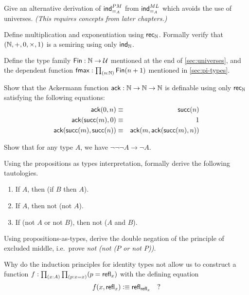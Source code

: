 \begin{ex}\label{ex:pm-to-ml}
Give an alternative derivation of $\mathsf{ind}_{=_A}^{PM}$ from $\mathsf{ind}_{=_A}^{ML}$ which avoids the use of universes.
  \emph{(This requires concepts from later chapters.)}
\end{ex}

\begin{ex}
Define multiplication and exponentiation using $\mathsf{rec}_{\mathbb{N}}$. Formally verify that $(\mathbb{N},+,0,\times,1)$ is a semiring using only $\mathsf{ind}_{\mathbb{N}}$.  
\end{ex}

\begin{ex}\label{ex:fin}
  Define the type family $\mathsf{Fin} : \mathbb{N} \to \mathcal{U}$ mentioned at the end of \autoref{sec:universes}, and the dependent function $\fmax : \prd{n:\nat} \Fin(n+1)$ mentioned in \autoref{sec:pi-types}.
\end{ex}

\begin{ex}\label{ex:ackermann}
  Show that the Ackermann function $\mathsf{ack} : \mathbb{N} \to \mathbb{N} \to \mathbb{N}$ is definable using only $\mathsf{rec}_{\mathbb{N}}$ satisfying the following equations:
  \begin{eqnarray*}
    \mathsf{ack}(0,n) & \equiv & \mathsf{succ}(n) \\
    \mathsf{ack}(\mathsf{succ}(m),0) & \equiv & 1 \\
    \mathsf{ack}(\mathsf{succ}(m),\mathsf{succ}(n)) & \equiv & \mathsf{ack}(m,\mathsf{ack}(\mathsf{succ}(m),n))
  \end{eqnarray*}
\end{ex}

\begin{ex}\label{ex:neg-ldn}
  Show that for any type $A$, we have $\neg\neg\neg A \to \neg A$.
\end{ex}

\begin{ex}\label{ex:tautologies}
  Using the propositions as types interpretation, formally derive the following tautologies.
  \begin{enumerate}
  \item If $A$, then (if $B$ then $A$).
  \item If $A$, then not (not $A$).
  \item If (not $A$ or not $B$), then not ($A$ and $B$).
  \end{enumerate}
\end{ex}

\begin{ex}\label{ex:not-not-lem}
  Using propositions-as-types, derive the double negation of the principle of excluded middle, i.e.\ prove \emph{not (not ($P$ or not $P$))}.
\end{ex}

\begin{ex}\label{ex:without-K}
  Why do the induction principles for identity types not allow us to construct a function $f: \prd{x:A}{p:x=x} (p = \refl{x})$ with the defining equation
  \[ f(x,\mathsf{refl}_{x}) \vcentcolon\equiv \mathsf{refl}_{\mathsf{refl}_{x}} \quad ?\]
\end{ex}

